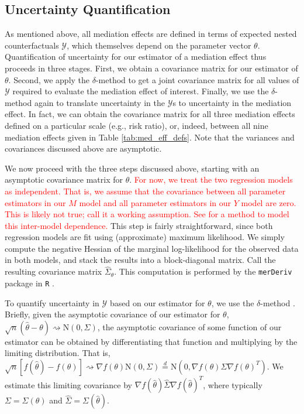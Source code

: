 \documentclass{report}
\newcommand{\sY}{\mathcal{Y}}
\begin{document}
\subsection{Uncertainty Quantification}

As mentioned above, all mediation effects are defined in terms of expected nested counterfactuals $\sY$, which themselves depend on the parameter vector $\theta$. Quantification of uncertainty for our estimator of a mediation effect thus proceeds in three stages. First, we obtain a covariance matrix for our estimator of $\theta$. Second, we apply the $\delta$-method to get a joint covariance matrix for all values of $\sY$ required to evaluate the mediation effect of interest. Finally, we use the $\delta$-method again to translate uncertainty in the $\sY$s to uncertainty in the mediation effect. In fact, we can obtain the covariance matrix for all three mediation effects defined on a particular scale (e.g., risk ratio), or, indeed, between all nine mediation effects given in Table \ref{tab:med_eff_defs}. Note that the variances and covariances discussed above are asymptotic. 

We now proceed with the three steps discussed above, starting with an asymptotic covariance matrix for $\theta$. \textcolor{red}{For now, we treat the two regression models as independent. That is, we assume that the covariance between all parameter estimators in our $M$ model and all parameter estimators in our $Y$ model are zero. This is likely not true; call it a working assumption. See \citet{Bau06} for a method to model this inter-model dependence.} This step is fairly straightforward, since both regression models are fit using (approximate) maximum likelihood. We simply compute the negative Hessian of the marginal log-likelihood for the observed data in both models, and stack the results into a block-diagonal matrix. Call the resulting covariance matrix $\hat{\Sigma}_\theta$. This computation is performed by the \texttt{merDeriv} package in \texttt{R} \citep{Wan18}.

To quantify uncertainty in $\sY$ based on our estimator for $\theta$, we use the $\delta$-method \citep[see, e.g., Chapter 3 of][]{vdV98}. Briefly, given the asymptotic covariance of our estimator for $\theta$, $\sqrt{n}(\hat{\theta} - \theta) \rightsquigarrow \mathrm{N}(0, \Sigma)$, the asymptotic covariance of some function of our estimator can be obtained by differentiating that function and multiplying by the limiting distribution. That is, $\sqrt{n}[f(\hat{\theta}) - f(\theta)] \rightsquigarrow \nabla f(\theta)\mathrm{N}(0, \Sigma) \overset{d}{=} \mathrm{N}(0, \nabla f(\theta) \Sigma \nabla f(\theta)^T)$. We estimate this limiting covariance by $\nabla f(\hat{\theta}) \hat{\Sigma} \nabla f(\hat{\theta})^T$, where typically $\Sigma = \Sigma(\theta)$ and $\hat{\Sigma} = \Sigma(\hat{\theta})$.
\end{document}
